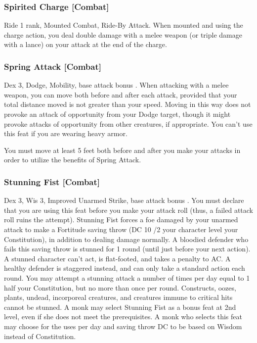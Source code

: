 \subsubsection{Spirited Charge [Combat]}
 Ride 1 rank, Mounted Combat, Ride-By Attack.
 When mounted and using the charge action, you deal double damage with a melee weapon (or triple damage with a lance) on your attack at the end of the charge.%

\subsubsection{Spring Attack [Combat]}
 Dex 3, Dodge, Mobility, base attack bonus .
 When attacking with a melee weapon, you can move both before and after each attack, provided that your total distance moved is not greater than your speed. Moving in this way does not provoke an attack of opportunity from your Dodge target, though it might provoke attacks of opportunity from other creatures, if appropriate. You can't use this feat if you are wearing heavy armor.
\par You must move at least 5 feet both before and after you make your attacks in order to utilize the benefits of Spring Attack.%

\subsubsection{Stunning Fist [Combat]}
 Dex 3, Wis 3, Improved Unarmed Strike, base attack bonus .
 You must declare that you are using this feat before you make your attack roll (thus, a failed attack roll ruins the attempt). Stunning Fist forces a foe damaged by your unarmed attack to make a Fortitude saving throw (DC 10 /2 your character level \add your Constitution), in addition to dealing damage normally. A bloodied defender who fails this saving throw is stunned for 1 round (until just before your next action). A stunned character can't act, is flat-footed, and takes a  penalty to AC. A healthy defender is staggered instead, and can only take a standard action each round. You may attempt a stunning attack a number of times per day equal to 1 \add half your Constitution, but no more than once per round. Constructs, oozes, plants, undead, incorporeal creatures, and creatures immune to critical hits cannot be stunned.
 A monk may select Stunning Fist as a bonus feat at 2nd level, even if she does not meet the prerequisites. A monk who selects this feat may choose for the uses per day and saving throw DC to be based on Wisdom instead of Constitution.

